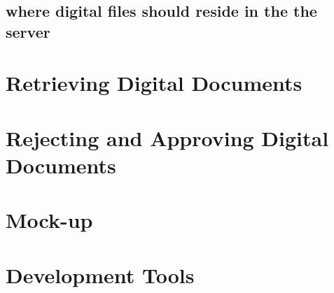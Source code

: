 \subsection{where digital files should reside in the the server}

\section{Retrieving Digital Documents}

\section{Rejecting and Approving Digital Documents}

\section{Mock-up}

\section{Development Tools}